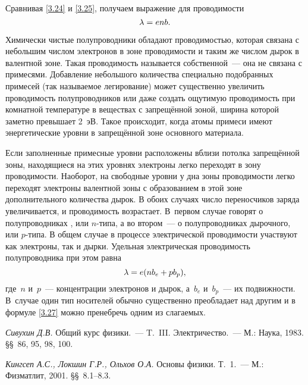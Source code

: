 Сравнивая \eqref{3.24} и \eqref{3.25}, получаем выражение для проводимости
\begin{equation}
	\eqmark{3.26}
	\lambda=enb.
\end{equation}

Химически чистые полупроводники обладают проводимостью, которая связана с
небольшим числом электронов в зоне
проводимости и таким же числом дырок в валентной зоне. Такая проводимость
называется собственной~--- она не связана с примесями. Добавление небольшого
количества специально подобранных примесей (так называемое
легирование) может существенно увеличить проводимость полупроводников или даже
создать ощутимую проводимость при комнатной температуре в веществах с
запрещённой зоной, ширина которой заметно превышает 2~эВ. Такое происходит,
когда атомы примеси имеют энергетические уровни в запрещённой зоне основного
материала.

Если заполненные примесные уровни расположены вблизи потолка запрещённой зоны,
находящиеся на этих уровнях электроны легко переходят в зону проводимости.
Наоборот, на свободные уровни у дна зоны проводимости легко переходят электроны
валентной зоны с образованием в этой зоне дополнительного количества дырок. В
обоих случаях число переносчиков заряда увеличивается, и проводимость
возрастает. В~первом случае говорят о полупроводниках ,
или $n$-типа, а во втором~--- о  полупроводниках дырочного, или $p$-типа. В
общем случае в процессе электрической проводимости участвуют как электроны, так
и дырки. Удельная электрическая проводимость полупроводника при этом равна
\begin{equation}
	\eqmark{3.27}
	\lambda=e(nb_e+pb_p),
\end{equation}
где~$n$ и~$p$~--- концентрации электронов и дырок, а~$b_e$ и~$b_p$~--- их
подвижности. В~случае  один тип носителей обычно существенно преобладает над другим и в
формуле \eqref{3.27} можно пренебречь одним из слагаемых.

\todo[inline]{<---}

\begin{lab:literature}
	\item{ \textit{Сивухин Д.В.} Общий курс физики.~--- T.~III. Электричество.~---
М.: Наука, 1983. \S\S~86, 95, 98, 100.}
	\item{ \textit{Кингсеп А.С., Локшин Г.Р., Ольхов О.А.} Основы физики.
Т.~1.~--- М.: Физматлит, 2001. \S\S~8.1--8.3.}
\end{lab:literature}


